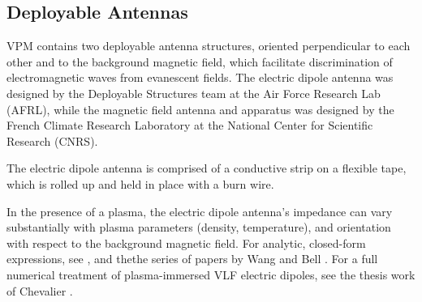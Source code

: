 \subsection{Deployable Antennas}
VPM contains two deployable antenna structures, oriented perpendicular to each other and to the background magnetic field, which facilitate discrimination of electromagnetic waves from evanescent fields. The electric dipole antenna was designed by the Deployable Structures team at the Air Force Research Lab (AFRL), while the magnetic field antenna and apparatus was designed by the French Climate Research Laboratory at the National Center for Scientific Research (CNRS).

The electric dipole antenna is comprised of a conductive strip on a flexible tape, which is rolled up and held in place with a burn wire. 




In the presence of a plasma, the electric dipole antenna's impedance can vary substantially with plasma parameters (density, temperature), and orientation with respect to the background magnetic field. For analytic, closed-form expressions, see \cite{Balmain1964}, and thethe series of papers by Wang and Bell \citep{Wang1969, Wang_Bell_1972}. For a full numerical treatment of plasma-immersed VLF electric dipoles, see the thesis work of Chevalier \citep{Chevalier2007}. 

